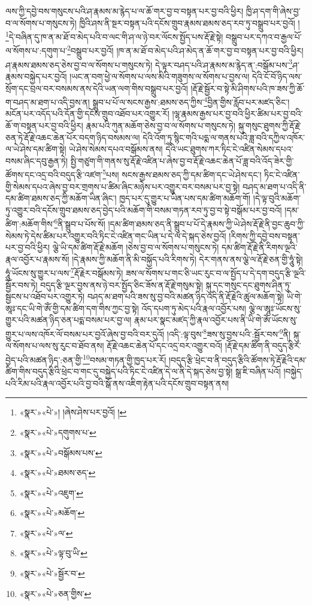 ལས་ཀྱི་དབྱེ་བས་གསུངས་པའི་ཤ་རྣམས་མ་རྙེད་པ་ལ་ཆོ་གར་བྱ་བ་བསྟན་པར་བྱ་བའི་ཕྱིར། ཁྱི་ཤ་དག་གི་ཞེས་བྱ་བ་ལ་སོགས་པ་གསུངས་ཏེ། ཁྱིའི་ཤས་ནི་སྔར་བསྟན་པའི་དངོས་གྲུབ་རྣམས་ཐམས་ཅད་རབ་ཏུ་བསྒྲུབ་པར་བྱའོ། །\footnote{«སྣར་»«པེ་»། །ཞེས་ཤེས་པར་བྱའོ། །}དེ་བཞིན་དུ་ཁ་ན་མ་ཐོ་བ་མེད་པའི་བ་ལང་གི་ཤ་ལ་ཉེ་བར་ལོངས་སྤྱོད་པས་རྡོ་རྗེ་སྟེ། བསྒྲུབ་པར་དཀའ་བ་རྒྱལ་པོ་ལ་སོགས་པ་:དགུག་པ་\footnote{«སྣར་»«པེ་»དགུགས་པ་}བསྒྲུབ་པར་བྱའོ། །ཁ་ན་མ་ཐོ་བ་མེད་པའི་ཤ་མེད་ན་ཆོ་གར་བྱ་བ་བསྟན་པར་བྱ་བའི་ཕྱིར། ཤ་རྣམས་ཐམས་ཅད་ཅེས་བྱ་བ་ལ་སོགས་པ་གསུངས་ཏེ། དེ་ལྟར་བཤད་པའི་ཤ་རྣམས་མ་རྙེད་ན་:བསྒོམ་པས་\footnote{«སྣར་»«པེ་»བསྒོམས་པས་}ཤ་རྣམས་བསྐྱེད་པར་བྱའོ། །ཡང་ན་བག་ཕྱེ་ལ་སོགས་པ་ལས་མིའི་གཟུགས་ལ་སོགས་པ་བྱས་ལ། དེའི་ངོ་བོ་ཉིད་ལས་སྲོག་དང་བྲལ་བར་བསམས་ནས་དེའི་ཡན་ལག་གིས་བསྒྲུབ་པར་བྱའོ། །རྡོ་རྗེ་སྦྱོར་བ་སྟེ་མི་ཤིགས་པའི་ཁ་ཟས་ཀྱི་ཆོ་ག་བཤད་མ་ཐག་པ་འདི་བྱས་ན། སྒྲུབ་པ་པོ་ལ་སངས་རྒྱས་:ཐམས་ཅད་ཀྱིས་\footnote{«སྣར་»«པེ་»ཐམས་ཅད་}བྱིན་གྱིས་རློབ་པར་མཛད་ཅིང་། མངོན་པར་འདོད་པའི་དོན་གྱི་དངོས་གྲུབ་འཐོབ་པར་འགྱུར་རོ། །ལྷ་རྣམས་རྒྱས་པར་བྱ་བའི་ཕྱིར་ཚིམ་པར་བྱ་བའི་ཆོ་ག་བསྟན་པར་བྱ་བའི་ཕྱིར། རྣམ་པའི་ཀུན་མཆོག་ཅེས་བྱ་བ་ལ་སོགས་པ་གསུངས་ཏེ། སྐུ་གསུང་ཐུགས་ཀྱི་རྡོ་རྗེ་ཅན་ཏེ་རྡོ་རྗེ་འཆང་ཆེན་པོར་བདག་ཉིད་བསམས་ལ། དེའི་འོག་ཏུ་སྙིང་གའི་པདྨ་ལ་གནས་པའི་ཟླ་བའི་དཀྱིལ་འཁོར་ལ་ཡེ་ཤེས་དམ་ཚིག་སྟེ། ཡེ་ཤེས་སེམས་དཔའ་བསྒོམས་ནས། དེའི་ཡང་ཐུགས་ཀར་ཏིང་ངེ་འཛིན་སེམས་དཔའ་བསམ་ཞིང་དབུ་རྒྱན་ཏེ། སྤྱི་གཙུག་གི་གནས་སུ་རྡོ་རྗེ་འཛིན་པ་ཞེས་བྱ་བ་རྡོ་རྗེ་འཆང་ཆེན་པོ་ཟླ་བའི་འོད་ཟེར་གྱི་ཚོགས་དང་འདྲ་བའི་བདུད་རྩི་འཛག་\footnote{«སྣར་»«པེ་»འཇུག་}པས། སངས་རྒྱས་ཐམས་ཅད་ཀྱི་དམ་ཚིག་དང་ཡེ་ཤེས་དང་། ཏིང་ངེ་འཛིན་གྱི་སེམས་དཔའ་ཞེས་བྱ་བར་གྲགས་པ་ཚིམ་ཞིང་མཉེས་པར་འགྱུར་བར་བསམ་པར་བྱ་སྟེ། བཤད་མ་ཐག་པ་འདི་ནི་དམ་ཚིག་ཐམས་ཅད་ཀྱི་མཆོག་ཡིན་ཞིང་། ཁྱད་པར་དུ་གྱུར་པ་ཡིན་པས་དམ་ཚིག་མཆོག་གོ། །དེ་ལྟ་བུའི་མཆོག་ཏུ་འགྱུར་བའི་དངོས་གྲུབ་ཐམས་ཅད་བྱེད་པའི་མཆོག་གི་བསམ་གཏན་རབ་ཏུ་བྱ་བ་སྟེ་བསྒོམ་པར་བྱ་བའོ། །དམ་ཚིག་:མཆོག་གིས་\footnote{«སྣར་»«པེ་»མཆོག་}ནི་སྒྲུབ་པ་པོས་སོ། །དམ་ཚིག་ཐམས་ཅད་ནི་སྒྲུབ་པ་པོ་དེ་རྣམས་ཀྱི་ཡེ་ཤེས་རྡོ་རྗེ་ནི་བྱང་ཆུབ་ཀྱི་སེམས་ཏེ་དེས་ཚིམ་པར་འགྱུར་བའི་ཏིང་ངེ་འཛིན་གང་ཡིན་པ་དེ་ལ་དེ་སྐད་ཅེས་བྱའོ། །རིགས་ཀྱི་དབྱེ་བས་བསྟན་པར་བྱ་བའི་ཕྱིར། ལྕེ་ཡི་དམ་ཚིག་རྡོ་རྗེ་མཆོག །ཅེས་བྱ་བ་ལ་སོགས་པ་གསུངས་ཏེ། དམ་ཚིག་རྡོ་རྗེ་ནི་རིགས་ལྔའི་རྣལ་འབྱོར་པ་རྣམས་སོ། །དེ་རྣམས་ཀྱི་མཆོག་ནི་མི་བསྐྱོད་པའི་རིགས་ཏེ། དེར་གནས་ནས་ལྕེ་ལ་རྡོ་རྗེ་ཅན་གྱི་ཧཱུཾ་སྟེ། ཧཱུཾ་ཡོངས་སུ་གྱུར་པ་ལས་\footnote{«སྣར་»«པེ་»ལ་}རྡོ་རྗེར་བསྒོམས་ཏེ། ཟས་ལ་སོགས་པ་གང་ཅི་ཡང་རུང་བ་ལ་སྤྱོད་པ་དེ་དག་བདུད་རྩི་ལྔའི་སྦྱོར་བས་ཏེ། བདུད་རྩི་ལྔར་བྱས་ནས་ཉེ་བར་སྤྱོད་ཅིང་ཟོས་ན་རྡོ་རྗེ་གསུམ་སྟེ། སྐུ་དང་གསུང་དང་ཐུགས་ཤིན་ཏུ་སྦྱངས་པ་འཐོབ་པར་འགྱུར་ཏེ། བཤད་མ་ཐག་པའི་ཟས་སུ་བྱ་བའི་མཚན་ཉིད་འདི་ནི་རྡོ་རྗེའི་ཚུལ་མཆོག་སྟེ། ཡི་གེ་ཨཱཿ་དང་ཡི་གེ་ཨོཾ་གྱི་དམ་ཚིག་དག་གིས་ཀྱང་བྱ་སྟེ། འོད་དཔག་ཏུ་མེད་པའི་རྣལ་འབྱོར་པས། ལྕེ་ལ་ཨཱཿ་ཡོངས་སུ་གྱུར་པའི་མཚན་ཉིད་ཅན་པདྨ་བསམ་པར་བྱ་ལ། རྣམ་པར་སྣང་མཛད་ཀྱི་རྣལ་འབྱོར་པས་ནི་ཡི་གེ་ཨོཾ་ཡོངས་སུ་གྱུར་པ་ལས་འཁོར་ལོ་བསམ་པར་བྱའོ་ཞེས་བྱ་བའི་བར་དུའོ། །འདི་:ལྟ་བུས་\footnote{«སྣར་»«པེ་»ལྟ་བུ་ཡི་}ཟས་སུ་བྱས་པའི་:སྦྱོར་བས་\footnote{«སྣར་»«པེ་»སྦྱོར་བ་}ནི། སྐུ་ལ་སོགས་པ་ལས་སུ་རུང་བ་ཐོབ་ནས། རྡོ་རྗེ་འཆང་ཆེན་པོ་དང་འདྲ་བར་འགྱུར་བའོ། །རྡོ་རྗེ་དམ་ཚིག་ནི་བདུད་རྩིར་བྱེད་པའི་མཚན་ཉིད་:ཅན་གྱི་\footnote{«སྣར་»«པེ་»ཅན་གྱིས་}བསམ་གཏན་གྱི་ཁྱད་པར་རོ། །བདུད་རྩི་ཕྲེང་བ་ནི་བདུད་རྩིའི་ཚོགས་ཏེ་རྡོ་རྗེའི་དམ་ཚིག་གིས་བདུད་རྩིའི་ཕྲེང་བ་གང་དུ་བསྐྱེད་པའི་ཏིང་ངེ་འཛིན་དེ་ལ་ནི་དེ་སྐད་ཅེས་བྱ་སྟེ། སྒྲ་ཇི་བཞིན་པའོ། །བསྐྱེད་པའི་རིམ་པའི་རྣལ་འབྱོར་པའི་བྱ་བའི་སྒོ་ནས་འཇིག་རྟེན་པའི་དངོས་གྲུབ་བསྟན་ནས། 